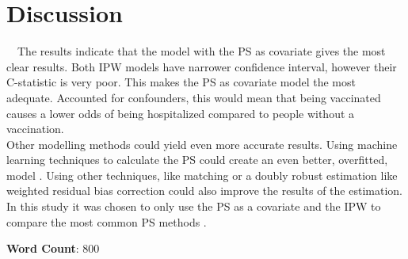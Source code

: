 \documentclass[
]{article}
\begin{document}
\hypertarget{discussion}{%
\section{Discussion}\label{discussion}}

~~The results indicate that the model with the PS as covariate gives the most clear results. Both IPW models have narrower confidence interval, however their C-statistic is very poor. This makes the PS as covariate model the most adequate. Accounted for confounders, this would mean that being vaccinated causes a lower odds of being hospitalized compared to people without a vaccination.\\
\hspace*{0.333em}\hspace*{0.333em}Other modelling methods could yield even more accurate results. Using machine learning techniques to calculate the PS could create an even better, overfitted, model \citep{schafer}. Using other techniques, like matching or a doubly robust estimation like weighted residual bias correction could also improve the results of the estimation. In this study it was chosen to only use the PS as a covariate and the IPW to compare the most common PS methods \citep{schafer}.

\textbf{Word Count}: 800

  
\end{document}

